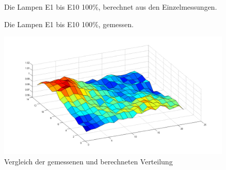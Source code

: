 \documentclass[a4paper,bibtotoc,oneside]{scrbook}
\begin{document}
\begin{figure} [htbp]
\caption{Die Lampen E1 bis E10 100\%, berechnet aus den Einzelmessungen.}
\label{b100}
\end{figure} 

\begin{figure} [htbp]
\caption{Die Lampen E1 bis E10 100\%, gemessen. }
\label{m100}
\end{figure} 

\begin{figure}[htbp]
\centering
\includegraphics[width=125mm]{img/vergleich100.png}
\caption{Vergleich der gemessenen und berechneten Verteilung}\label{v100}
\end{figure}
\end{document}
